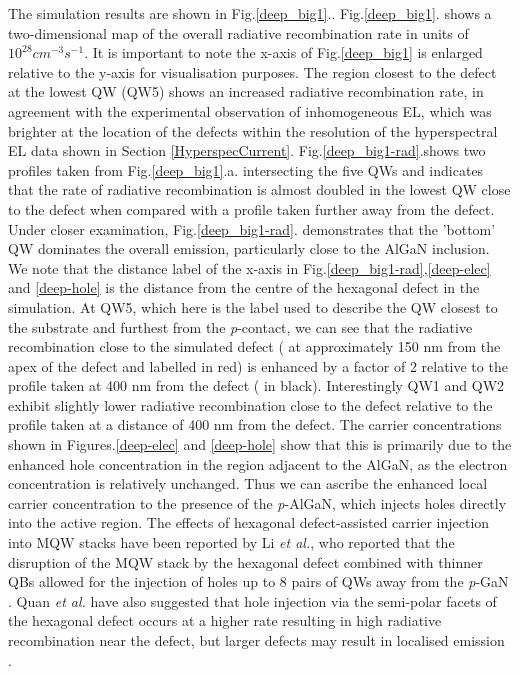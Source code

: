 The simulation results are shown in Fig.\ref{deep_big1}.. Fig.\ref{deep_big1}. shows a two-dimensional map of the overall radiative recombination rate in units of $10^{28} cm^{-3}s^{-1}$. It is important to note the x-axis of Fig.\ref{deep_big1} is enlarged relative to the y-axis for visualisation purposes. The region closest to the defect at the lowest QW (QW5) shows an increased radiative recombination rate, in agreement with the experimental observation of inhomogeneous EL, which was brighter at the location of the defects within the resolution of the hyperspectral EL data shown in Section \ref{HyperspecCurrent}. Fig.\ref{deep_big1-rad}.shows two profiles taken from Fig.\ref{deep_big1}.a. intersecting the five QWs and indicates that the rate of radiative recombination is almost doubled in the lowest QW close to the defect when compared with a profile taken further away from the defect.\\
Under closer examination, Fig.\ref{deep_big1-rad}. demonstrates that the 'bottom' QW dominates the overall emission, particularly close to the AlGaN inclusion. We note that the distance label of the x-axis in Fig.\ref{deep_big1-rad},\ref{deep-elec} and \ref{deep-hole} is the distance from the centre of the hexagonal defect in the simulation. At QW5, which here is the label used to describe the QW closest to the substrate and furthest from the \textit{p}-contact, we can see that the radiative recombination close to the simulated defect ( at approximately 150 nm from the apex of the defect and labelled in red) is enhanced by a factor of 2 relative to the profile taken at 400 nm from the defect ( in black). Interestingly QW1 and QW2 exhibit slightly lower radiative recombination close to the defect relative to the profile taken at a distance of 400 nm from the defect. The carrier concentrations shown in Figures.\ref{deep-elec} and \ref{deep-hole} show that this is primarily due to the enhanced hole concentration in the region adjacent to the AlGaN, as the electron concentration is relatively unchanged. Thus we can ascribe the enhanced local carrier concentration to the presence of the \textit{p}-AlGaN, which injects holes directly into the active region. The effects of hexagonal defect-assisted carrier injection into MQW stacks have been reported by Li \textit{et al.}, who reported that the disruption of the MQW stack by the hexagonal defect combined with thinner QBs allowed for the injection of holes up to 8 pairs of QWs away from the \textit{p}-GaN \cite{Li2014}. Quan \textit{et al.} have also suggested that hole injection via the semi-polar facets of the hexagonal defect occurs at a higher rate resulting in high radiative recombination near the defect, but larger defects may result in localised emission \cite{Quan2014}.

